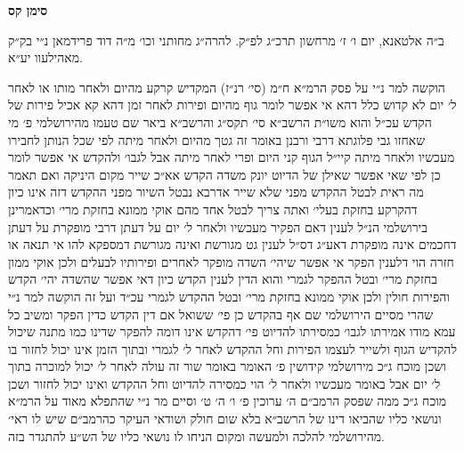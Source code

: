 \documentclass[12pt, openany]{book}
\newcommand{\chapname}{}
\newcommand{\newchap}[1]{
	\addcontentsline{toc}{chapter}{#1}
	\renewcommand{\chapname}{#1}
		\begin{center}
			\textbf{%
\fontsize{16pt}{16pt}\selectfont
				#1}
		\end{center}
}
\begin{document}
\newchap{סימן קס}
\begin{multicols}{2}
ב״ה אלטאנא, יום ו׳ ז׳ מרחשון תרכ״ג לפ״ק. להרה״ג מחותני וכו׳ מ״ה דוד פרידמאן נ״י בק״ק מאהילעוו יע״א.\\\vspace{0pt}

הוקשה למר נ״י על פסק הרמ״א ח״מ (סי׳ רנ״ז) המקדיש קרקע מהיום ולאחר מותו או לאחר ל׳ יום לא קדוש כלל דהא אי אפשר לומר גוף מהיום ופירות לאחר זמן דהא קא אכיל פירות של הקדש עכ״ל והוא משו״ת הרשב״א סי׳ תקס״ג והרשב״א ביאר שם טעמו מהירושלמי פ׳ מי שאחזו גבי פלוגתא דרבי ורבנן באומר זה גטך מהיום ולאחר מיתה לפי שכל הנותן לחבירו מעכשיו ולאחר מיתה קיי״ל הגוף קני היום ופרי לאחר מיתה אבל לגבו׳ ולהקדש אי אפשר לומר כן לפי שאי אפשר שאילן של הדיוט יונק משדה הקדש אא״כ שייר מקום היניקה ואם תאמר מה ראית לבטל ההקדש מפני שלא שייר אדרבא נבטל השיור מפני ההקדש דזה אינו כיון דהקרקע בחזקת בעלי׳ ואתה צריך לבטל אחד מהם אוקי ממונא בחזקת מרי׳ וכדאמרינן בירושלמי הנ״ל לענין דאם הפקיר מעכשיו ולאחר ל׳ יום על דעתן דרבי מופקרת על דעתן דחכמים אינה מופקרת דאע״ג דס״ל לענין גט מגורשת ואינה מגורשת דמספקא להו אי תנאה או חזרה הוי דלענין הפקר אי אפשר שיהי׳ השדה מופקר לאחרים ופירותיו לבעלים ולכן אוקי ממון בחזקת מרי׳ ובטל ההפקר לגמרי והוא הדין לענין הקדש כיון דאי אפשר שהשדה יהי׳ הקדש והפירות חולין ולכן אוקי ממונא בחזקת מרי׳ ובטל ההקדש לגמרי עכ״ד ועל זה הוקשה למר נ״י שהרי מסיים הירושלמי שם אף בהקדש כן פי׳ ששואל אם דין הקדש כדין הפקר ומשיב כל עמא מודו אמירתו לגבו׳ כמסירתו להדיוט פי׳ דהקדש אינו דומה להפקר שדינו כמו מתנה שיכול להקדיש הגוף ולשייר לעצמו הפירות וחל ההקדש לאחר ל׳ לגמרי ובתוך הזמן אינו יכול לחזור בו ושכן מוכח ג״כ מירושלמי קידושין פ׳ האומר באומר שור זה עולה לאחר ל׳ יכול למוכרה בתוך ל׳ יום אבל באומר מעכשיו ולאחר ל׳ הוי כמסירה להדיוט וחל ההקדש ואינו יכול לחזור ושכן מוכח ג״כ ממה שפסק הרמב״ם ה׳ ערוכין פ׳ ו׳ ה׳ ט׳ וסיים מר נ״י שהתפלא מאוד על הרמ״א ונושאי כליו שהביאו דינו של הרשב״א בלא שום חולק ושודאי העיקר כהרמב״ם שיש לו ראי׳ מהירושלמי להלכה ולמעשה ומקום הניחו לו נושאי כליו של הש״ע להתגדר בזה.\\\vspace{0pt}


\end{multicols}
\end{document}
